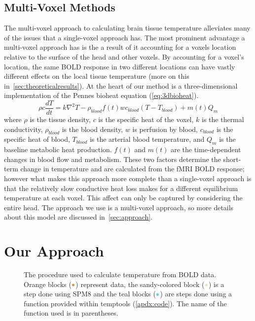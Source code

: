    \subsection{\label{sec:multivox} Multi-Voxel Methods}
    The multi-voxel approach to calculating brain tissue temperature alleviates many of the issues that a single-voxel approach has.  The most prominent advantage a multi-voxel approach has is the a result of it accounting for a voxels location relative to the surface of the head and other voxels.  By accounting for a voxel's location, the same BOLD response in two different locations can have vastly different effects on the local tissue temperature (more on this in~\cref{sec:theoreticalresults}).
    At the heart of our method is a three-dimensional implementation of the Pennes bioheat equation (\cref{eq:3dbioheat})\citep{collins}.
    \begin{equation} \label{eq:3dbioheat} 
    	\rho c \frac{dT}{dt} = k \nabla^{2}T-\rho_{blood}f(t)wc_{blood}(T-T_{blood})+m(t)Q_{m} 
    \end{equation}
  where $\rho$ is the tissue density, $c$ is the specific heat of the voxel, $k$ is the thermal conductivity, $\rho_{blood}$ is the blood density, $w$ is perfusion by blood, $c_{blood}$ is the specific heat of blood, $T_{blood}$ is the arterial blood temperature, and $Q_{m}$ is the baseline metabolic heat production. $f(t)$ and $m(t)$ are the time-dependent changes in blood flow and metabolism. These two factors determine the short-term change in temperature and are calculated from the fMRI BOLD response; however what makes this approach more complete than a single-voxel approach is that the relatively slow conductive heat loss makes for a different equilibrium temperature at each voxel.  This affect can only be captured by considering the entire head.  The approach we use is a multi-voxel approach, so more details about this model are discussed in~\cref{sec:approach}.

\section{\label{sec:approach} Our Approach}
\begin{figure}[tb]
  \vspace{10pt}
  \centering
  
  \caption[Procedure used to calculate temperature change]{\label{fig:procedureflowchart} The procedure used to calculate temperature from BOLD data.  Orange blocks ($\color{goldfish}\bullet$) represent data, the sandy-colored block ($\color{beachstorm}\bullet$) is a step done using SPM8 and the teal blocks ($\color{aoi}\bullet$) are steps done using a function provided within temptools (\cref{apdx:code}).  The name of the function used is in parentheses.}
\end{figure}

